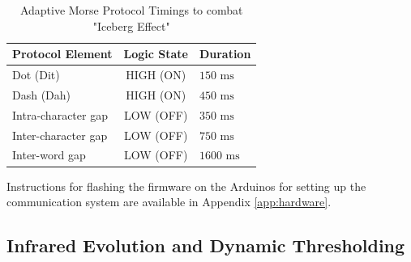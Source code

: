\documentclass[conference]{IEEEtran}
\begin{document}
\begin{table}[htbp]
\caption{Adaptive Morse Protocol Timings to combat "Iceberg Effect"}
\label{tab:morse_timing-modified}
\centering
\begin{tabular}{|l|c|l|}
\hline
\textbf{Protocol Element} & \textbf{Logic State} & \textbf{Duration} \\ \hline
Dot (Dit)                 & HIGH (ON)            &  $150\text{ ms}$ \\ \hline
Dash (Dah)                & HIGH (ON)            &  $450\text{ ms}$ \\ \hline
Intra-character gap       & LOW (OFF)            &  $350\text{ ms}$ \\ \hline
Inter-character gap       & LOW (OFF)            &  $750\text{ ms}$ \\ \hline
Inter-word gap            & LOW (OFF)            &  $1600\text{ ms}$ \\ \hline
\end{tabular}
\end{table}
Instructions for flashing the firmware on the Arduinos for setting up the communication system are available in Appendix \ref{app:hardware}.

\subsection{Infrared Evolution and Dynamic Thresholding}
\end{document}
